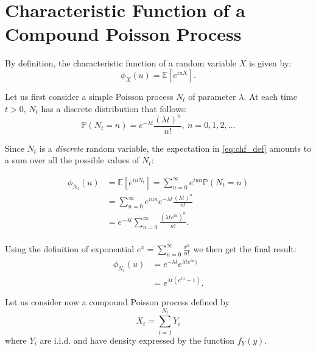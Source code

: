 \chapter{Characteristic Function of a Compound Poisson Process }
\label{app:A}


By definition, the characteristic function of a random variable $X$ is given by:
\begin{equation}
\label{eq:chf_def}
	\phi_{X}(u) = \mathbb{E}[e^{iuX}].
\end{equation}

Let us first consider a simple Poisson process $N_t$ of parameter $\lambda$. At each time $t >0$, $N_t$ has a discrete distribution that follows:
\begin{equation}
\mathbb{P}( N_t = n) = e^{-\lambda t}\frac{(\lambda t)^n}{n!} ,\: n = 0,1,2,...
\end{equation}

Since $N_t$ is a \textit{discrete} random variable, the expectation in \eqref{eq:chf_def} amounts to a sum over all the possible values of $N_t$:

\begin{equation*} 
	\begin{split}
	\phi_{N_t}(u) & = \mathbb{E}[e^{iu N_t}] = \sum_{n=0}^{\infty} e^{iun} \mathbb{P}( N_t = n)\\
	&= \sum_{n=0}^{\infty}e^{iun}e^{-\lambda t}\frac{(\lambda t)^n}{n!}\\
	&= e^{-\lambda t} \sum_{n=0}^{\infty}\frac{(\lambda t e^{iu})^n}{n!}.\\
	\end{split}
\end{equation*}

Using the definition of exponential $e^x  = \sum_{n=0}^{\infty} \frac{x^n}{n!}$ we then get the final result:
\begin{equation*} 
	\begin{split}
	\phi_{N_t}(u) & = e^{-\lambda t} e^{\lambda t e^{iu})}\\
	& = e^{\lambda t (e^{iu}-1)}.
	\end{split}
\end{equation*}

Let us consider now a compound Poisson process defined by 
\begin{equation}
	X_t = \sum_{i=1}^{N_t} Y_i
\end{equation}
where $Y_i$ are i.i.d. and have density expressed by the function $f_Y(y)$.

